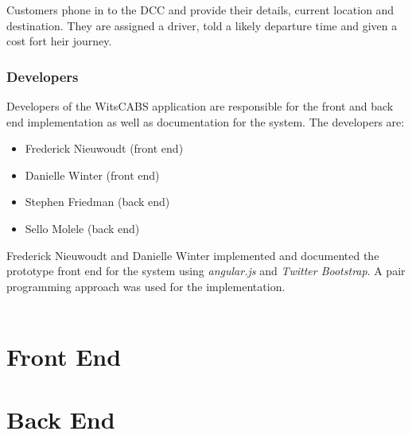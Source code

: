 \documentclass[12pt]{article}
\begin{document}
Customers phone in to the DCC and provide their details, current location and destination. They are assigned a driver, told a likely departure time and given a cost fort heir journey.

\subsubsection{Developers}
Developers of the WitsCABS application are responsible for the front and back end implementation as well as documentation for the system. The developers are:
\begin{itemize}
\item Frederick Nieuwoudt (front end)
\item Danielle Winter (front end)
\item Stephen Friedman (back end)
\item Sello Molele (back end)
\end{itemize} 
Frederick Nieuwoudt and Danielle Winter implemented and documented the prototype front end for the system using \textit{angular.js} and \textit{Twitter Bootstrap}. A pair programming approach was used for the implementation.\\\\


\newpage
\section{Front End}

\newpage
\section{Back End}
\end{document}
